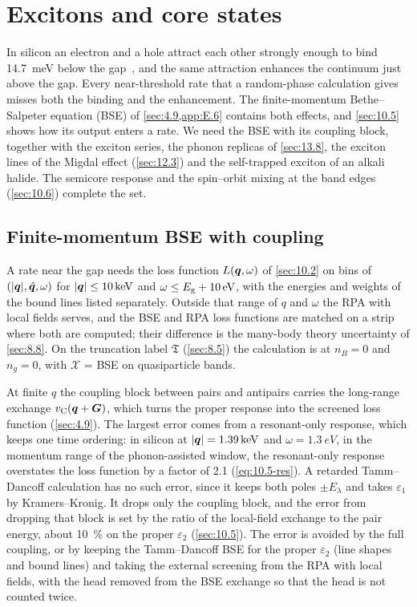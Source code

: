 \section{Excitons and core states}\label{app:E.15}

In silicon an electron and a hole attract each other strongly enough to bind \SI{14.7}{meV} below the gap~\cite{shaklee1970valley}, and the same attraction enhances the continuum just above the gap. Every near-threshold rate that a random-phase calculation gives misses both the binding and the enhancement. The finite-momentum Bethe--Salpeter equation (BSE) of \cref{sec:4.9,app:E.6} contains both effects, and \cref{sec:10.5} shows how its output enters a rate. We need the BSE with its coupling block, together with the exciton series, the phonon replicas of \cref{sec:13.8}, the exciton lines of the Migdal effect (\cref{sec:12.3}) and the self-trapped exciton of an alkali halide. The semicore response and the spin--orbit mixing at the band edges (\cref{sec:10.6}) complete the set.

\subsection{Finite-momentum BSE with coupling}

A rate near the gap needs the loss function $L(\bm{q},\omega)$ of \cref{sec:10.2} on bins of $(|\bm{q}|,\hat{\bm{q}},\omega)$ for $|\bm{q}| \le \SI{10}{keV}$ and $\omega \le E_{\mathrm{g}} + \SI{10}{eV}$, with the energies and weights of the bound lines listed separately. Outside that range of $q$ and $\omega$ the RPA with local fields serves, and the BSE and RPA loss functions are matched on a strip where both are computed; their difference is the many-body theory uncertainty of \cref{sec:8.8}. On the truncation label $\mathfrak{T}$ (\cref{sec:8.5}) the calculation is at $n_B = 0$ and $n_g = 0$, with $\mathcal{X}$ = BSE on quasiparticle bands.

At finite $q$ the coupling block between pairs and antipairs carries the long-range exchange $v_{\mathrm{C}}(\bm{q}+\bm{G})$, which turns the proper response into the screened loss function (\cref{sec:4.9}). The largest error comes from a resonant-only response, which keeps one time ordering: in silicon at $|\bm{q}| = \SI{1.39}{keV}$ and $\omega = \SI{1.3}{eV}$, in the momentum range of the phonon-assisted window, the resonant-only response overstates the loss function by a factor of 2.1 (\cref{eq:10.5-res}). A retarded Tamm--Dancoff calculation has no such error, since it keeps both poles $\pm E_\lambda$ and takes $\varepsilon_1$ by Kramers--Kronig. It drops only the coupling block, and the error from dropping that block is set by the ratio of the local-field exchange to the pair energy, about \SI{10}{\percent} on the proper $\varepsilon_2$ (\cref{sec:10.5}). The error is avoided by the full coupling, or by keeping the Tamm--Dancoff BSE for the proper $\varepsilon_2$ (line shapes and bound lines) and taking the external screening from the RPA with local fields, with the head removed from the BSE exchange so that the head is not counted twice.

